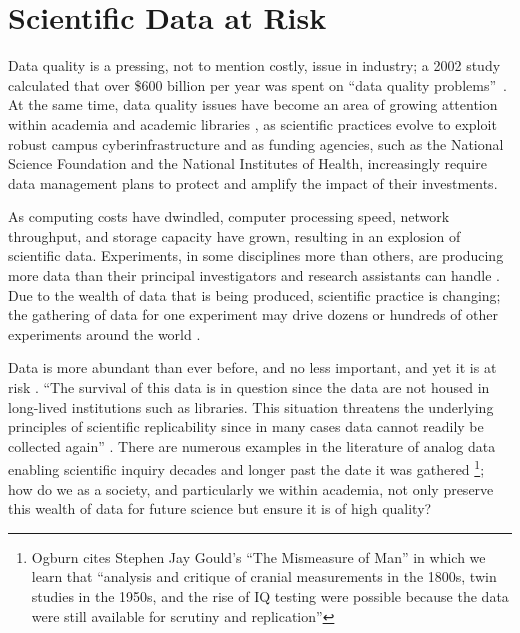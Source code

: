 \documentclass{acm_proc_article-sp}
\begin{document}


\section{Scientific Data at Risk}
Data quality is a pressing, not to mention costly, issue in industry;
a 2002 study \cite{russom:case} calculated that over \$600 billion per
year was spent on ``data quality problems''\ 
\cite{eckerson:bottomline}.  At the same time, data quality issues
have become an area of growing attention within academia and academic
libraries \cite{heidorn:libraries,arl:stewardship,ogburn:imperative,jisc:deluge},
as scientific practices evolve to exploit robust campus
cyberinfrastructure and as funding agencies, such as the National
Science Foundation and the National Institutes of Health, increasingly
require data management plans to protect and amplify the impact of
their investments.

As computing costs have dwindled, computer processing speed, network
throughput, and storage capacity have grown, resulting in an explosion
of scientific data.  Experiments, in some disciplines more than
others, are producing more data than their principal investigators and
research assistants can handle \cite{adams:galaxyzoo}. Due to the
wealth of data that is being produced, scientific practice is
changing; the gathering of data for one experiment may drive dozens or
hundreds of other experiments around the world \cite{jisc:deluge}.

Data is more abundant than ever before, and no less important, and yet
it is at risk \cite{ogburn:imperative,heidorn:libraries}.  ``The
survival of this data is in question since the data are not housed in
long-lived institutions such as libraries. This situation threatens
the underlying principles of scientific replicability since in many
cases data cannot readily be collected again''
\cite{heidorn:libraries}. There are numerous examples in the
literature of analog data enabling scientific inquiry decades and
longer past the date it was gathered \footnote{Ogburn
  \cite{ogburn:imperative} cites Stephen Jay Gould's ``The Mismeasure
  of Man'' in which we learn that ``analysis and critique of cranial
  measurements in the 1800s, twin studies in the 1950s, and the rise
  of IQ testing were possible because the data were still available
  for scrutiny and replication''}; how do we as a society, and
particularly we within academia, not only preserve this wealth of data
for future science but ensure it is of high quality?
\end{document}
